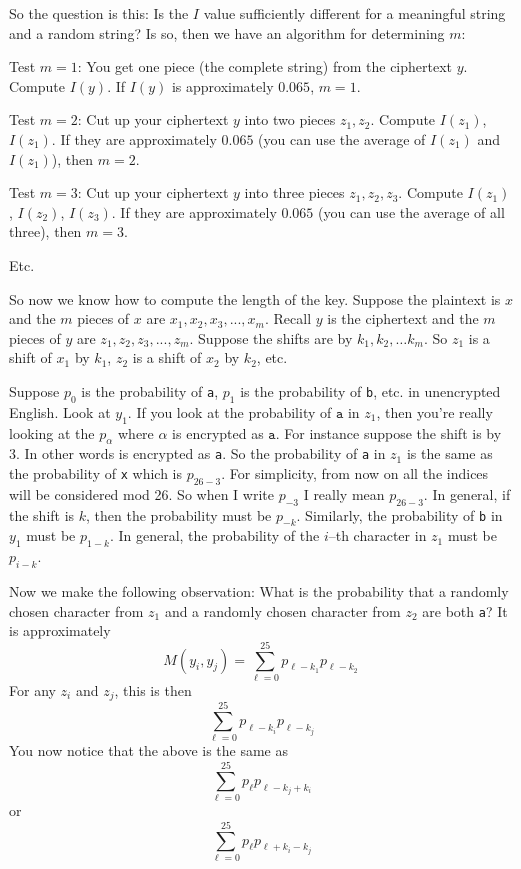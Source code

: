 


So the question is this: Is the $I$ value sufficiently different
for a meaningful string and a random string? Is so, then we have
an algorithm for determining $m$:

Test $m = 1$:
You get one piece (the complete string) from the ciphertext
$y$.
Compute $I(y)$.
If $I(y)$ is approximately $0.065$, $m = 1$.

Test $m = 2$:
Cut up your ciphertext $y$ into two pieces
$z_1, z_2$.
Compute
$I(z_1)$,
$I(z_1)$.
If they are approximately $0.065$ (you can use the average of
$I(z_1)$ and 
$I(z_1)$), then $m = 2$.

Test $m = 3$:
Cut up your ciphertext $y$ into three pieces
$z_1, z_2, z_3$.
Compute
$I(z_1)$,
$I(z_2)$,
$I(z_3)$.
If they are approximately $0.065$ (you can use the average of all three),
then $m = 3$.

Etc.

So now we know how to compute the length of the key.
Suppose the plaintext is $x$ and the $m$ pieces of $x$ are
$x_1, x_2, x_3, ..., x_m$.
Recall $y$ is the ciphertext and the $m$ pieces of $y$ are
$z_1, z_2, z_3, ..., z_m$.
Suppose the
shifts are by $k_1, k_2, \ldots k_m$.
So 
$z_1$ is a shift of $x_1$ by $k_1$, $z_2$ is a shift of
$x_2$ by $k_2$, etc.

Suppose $p_0$ is the probability of \texttt{a}, $p_1$ is the
probability of \texttt{b}, etc. in unencrypted English.  Look at
$y_1$. If you look at the probability of $\texttt{a}$ in $z_1$,
then you're really looking at the $p_\alpha$ where $\alpha$ is
encrypted as $\texttt{a}$. For instance suppose the shift is by 3.
In other words  is encrypted as \texttt{a}. So the
probability of \texttt{a} in $z_1$ is the same as the probability
of \texttt{x} which is $p_{26-3}$. For simplicity, from now on all the indices
will be considered mod 26. So when I write $p_{-3}$ I really mean
$p_{26-3}$. In general, if the shift is $k$, then the probability
must be $p_{-k}$. Similarly, the probability of \texttt{b} in
$y_1$ must be $p_{1-k}$. In general, the probability of the
$i$--th character in $z_1$ must be $p_{i-k}$.

Now we make the following observation: What is the probability
that a randomly chosen character from $z_1$ and a randomly chosen
character from $z_2$ are both \texttt{a}? It is approximately
\[
 M(y_i,y_j) = \sum_{\ell=0}^{25} p_{\ell-k_1} p_{\ell-k_2}
\]
For any $z_i$ and $z_j$, this is then
\[
 \sum_{\ell=0}^{25} p_{\ell-k_i} p_{\ell-k_j}
\]
You now notice that the above is the same as
\[
 \sum_{\ell=0}^{25} p_{\ell} p_{\ell-k_j+k_i}
\]
or
\[
 \sum_{\ell=0}^{25} p_{\ell} p_{\ell+k_i-k_j}
\]

